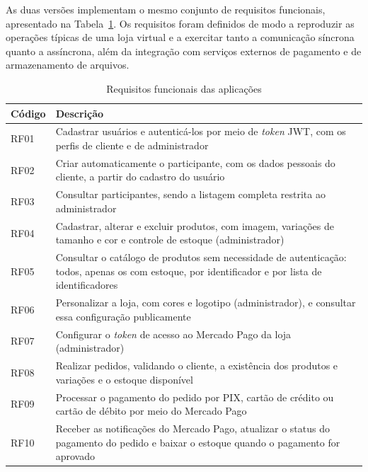 As duas versões implementam o mesmo conjunto de requisitos funcionais, apresentado na
Tabela~\ref{tab:requisitos}. Os requisitos foram definidos de modo a reproduzir as operações
típicas de uma loja virtual e a exercitar tanto a comunicação síncrona quanto a assíncrona,
além da integração com serviços externos de pagamento e de armazenamento de arquivos.

\begin{table}[htbp]
\centering
\caption{Requisitos funcionais das aplicações}
\label{tab:requisitos}
\small
\begin{tabular}{|>{\raggedright\arraybackslash}p{1.5cm}|>{\raggedright\arraybackslash}p{13.1cm}|}
\hline
\textbf{Código} & \textbf{Descrição} \\ \hline
RF01 & Cadastrar usuários e autenticá-los por meio de \textit{token} JWT, com os perfis de cliente e de administrador \\ \hline
RF02 & Criar automaticamente o participante, com os dados pessoais do cliente, a partir do cadastro do usuário \\ \hline
RF03 & Consultar participantes, sendo a listagem completa restrita ao administrador \\ \hline
RF04 & Cadastrar, alterar e excluir produtos, com imagem, variações de tamanho e cor e controle de estoque (administrador) \\ \hline
RF05 & Consultar o catálogo de produtos sem necessidade de autenticação: todos, apenas os com estoque, por identificador e por lista de identificadores \\ \hline
RF06 & Personalizar a loja, com cores e logotipo (administrador), e consultar essa configuração publicamente \\ \hline
RF07 & Configurar o \textit{token} de acesso ao Mercado Pago da loja (administrador) \\ \hline
RF08 & Realizar pedidos, validando o cliente, a existência dos produtos e variações e o estoque disponível \\ \hline
RF09 & Processar o pagamento do pedido por PIX, cartão de crédito ou cartão de débito por meio do Mercado Pago \\ \hline
RF10 & Receber as notificações do Mercado Pago, atualizar o status do pagamento do pedido e baixar o estoque quando o pagamento for aprovado \\ \hline
\end{tabular}
\par\vspace{4pt}{\footnotesize Fonte: Elaborada pelo autor (2026).}
\end{table}

